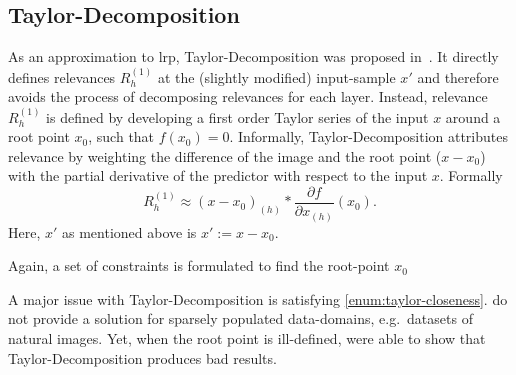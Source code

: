 \subsection{Taylor-Decomposition}
As an approximation to \gls{lrp}, Taylor-Decomposition was proposed in~\cite{Bach.2015}. It directly defines relevances \(R_{h}^{(1)}\) at the (slightly modified) input-sample \(x'\) and therefore avoids the process of decomposing relevances for each layer. Instead, relevance \(R_{h}^{(1)}\) is defined by developing a first order Taylor series of the input \(x\) around a root point \(x_0\), such that \(f(x_0) = 0\). Informally, Taylor-Decomposition attributes relevance by weighting the difference of the image and the root point (\(x-x_0\)) with the partial derivative of the predictor with respect to the input \(x\). Formally
\begin{equation}
    R_{h}^{(1)} \approx (x-x_0)_{(h)} * \frac{\partial f}{\partial x_{(h)}}(x_0).
\end{equation}
Here, \(x'\) as mentioned above is \(x':=x-x_0\).
\par
Again, a set of constraints is formulated to find the root-point \(x_0\)
A major issue with Taylor-Decomposition is satisfying \cref{enum:taylor-closeness}.  do not provide a solution for sparsely populated data-domains, e.g.\ datasets of natural images. Yet, when the root point is ill-defined,  were able to show that Taylor-Decomposition produces bad results.


